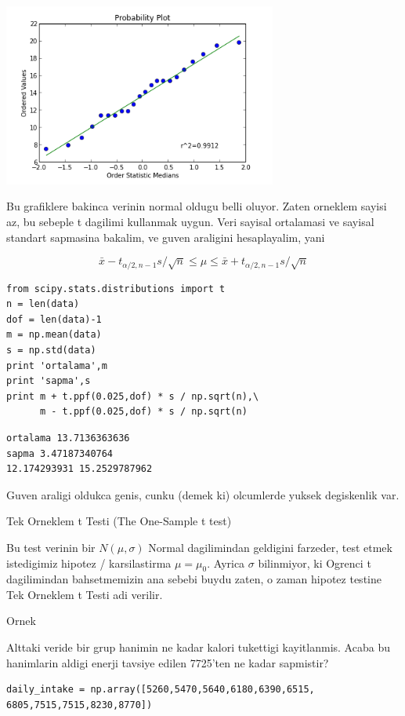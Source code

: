 \documentclass[12pt,fleqn]{article}\usepackage{../common}
\begin{document}
\includegraphics[height=6cm]{stat_sampling_dist_02.png}

Bu grafiklere bakinca verinin normal oldugu belli oluyor. Zaten orneklem
sayisi az, bu sebeple t dagilimi kullanmak uygun. Veri sayisal ortalamasi
ve sayisal standart sapmasina bakalim, ve guven araligini hesaplayalim, 
yani

$$ \bar{x} - t_{\alpha/2,n-1}s/\sqrt{n} \le
\mu \le
 \bar{x} + t_{\alpha/2,n-1}s/\sqrt{n}
$$

\begin{verbatim}
from scipy.stats.distributions import t
n = len(data)
dof = len(data)-1
m = np.mean(data)
s = np.std(data)
print 'ortalama',m
print 'sapma',s
print m + t.ppf(0.025,dof) * s / np.sqrt(n),\
      m - t.ppf(0.025,dof) * s / np.sqrt(n)
\end{verbatim}

\begin{verbatim}
ortalama 13.7136363636
sapma 3.47187340764
12.174293931 15.2529787962
\end{verbatim}

Guven araligi oldukca genis, cunku (demek ki) olcumlerde yuksek degiskenlik
var. 

Tek Orneklem t Testi (The One-Sample t test)

Bu test verinin bir $N(\mu,\sigma)$ Normal dagilimindan geldigini farzeder,
test etmek istedigimiz hipotez / karsilastirma $\mu = \mu_0$. Ayrica
$\sigma$ bilinmiyor, ki Ogrenci t dagilimindan bahsetmemizin ana sebebi
buydu zaten, o zaman hipotez testine Tek Orneklem t Testi adi verilir.

Ornek

Alttaki veride bir grup hanimin ne kadar kalori tukettigi
kayitlanmis. Acaba bu hanimlarin aldigi enerji tavsiye edilen 7725'ten ne
kadar sapmistir?

\begin{verbatim}
daily_intake = np.array([5260,5470,5640,6180,6390,6515, 6805,7515,7515,8230,8770])
\end{verbatim}
\end{document}
